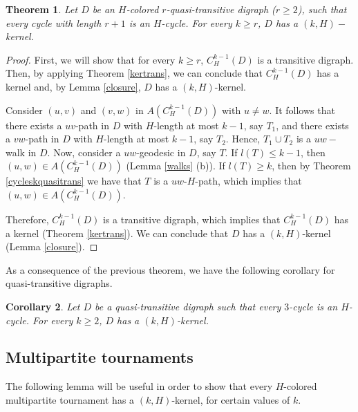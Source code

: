 \documentclass[10pt,a4paper]{article}
\newtheorem{theorem}{Theorem}[section]
\newtheorem{cor}[theorem]{Corollary}
\begin{document}
\begin{theorem}
\label{tqtrc}
Let $D$ be an $H$-colored $r$-quasi-transitive digraph ($r \geq 2$), such that every cycle with length $r+1$ is an $H$-cycle. For every $k \geq r$, $D$ has a $(k,H)-$kernel.
\end{theorem}
\begin{proof}
First, we will show that for every $k \geq r$, $C_{H}^{k-1}(D)$ is a transitive digraph. Then, by applying Theorem \ref{kertrans}, we can conclude that $C_{H}^{k-1}(D)$ has a kernel and, by Lemma \ref{closure}, $D$ has a $(k,H)$-kernel.

Consider $(u,v)$ and $(v,w)$ in $A(C_{H}^{k-1}(D))$ with $u \neq w$. It follows that there exists a $uv$-path in $D$ with $H$-length at most $k-1$, say $T_{1}$, and there exists a $vw$-path in $D$ with $H$-length at most $k-1$, say $T_{2}$. Hence, $T_{1} \cup T_{2}$ is a $uw-$walk in $D$. Now, consider a $uw$-geodesic in $D$, say $T$. If $l(T) \leq k-1$, then $(u,w) \in A(C_{H}^{k-1}(D))$ (Lemma \ref{walks} (b)). If $l(T) \geq k$, then by Theorem \ref{cycleskquasitrans} we have that $T$ is a $uw$-$H$-path, which implies that $(u,w) \in A(C_{H}^{k-1}(D))$. 

Therefore, $C_{H}^{k-1}(D)$ is a transitive digraph, which implies that $C_{H}^{k-1}(D)$ has a kernel (Theorem \ref{kertrans}). We can conclude that $D$ has a $(k, H)$-kernel (Lemma \ref{closure}). 
\end{proof}

As a consequence of the previous theorem, we have the following corollary for quasi-transitive digraphs.

\begin{cor}
Let $D$ be a quasi-transitive digraph such that every $3$-cycle is an $H$-cycle. For every $k \geq 2$, $D$ has a $(k, H)$-kernel. 
\end{cor}


\subsection{Multipartite tournaments}

The following lemma will be useful in order to show that every $H$-colored multipartite tournament has a $(k,H)$-kernel, for certain values of $k$.
\end{document}
